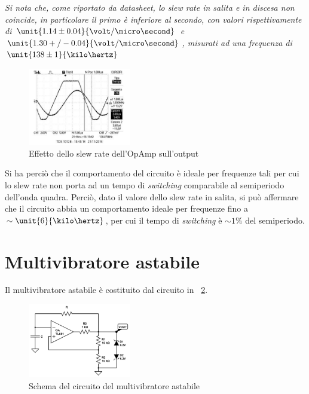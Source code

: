 \documentclass[10pt,a4paper]{article}
\begin{document}
\emph{Si nota che, come riportato da datasheet, lo slew rate in salita e in discesa non coincide, in particolare il primo è inferiore al secondo, con valori rispettivamente di $\unit{1.14 \pm 0.04}{\volt/\micro\second}$ e $\unit{1.30+/-0.04}{\volt/\micro\second}$, misurati ad una frequenza di $\unit{138 \pm 1}{\kilo\hertz}$}

\begin{figure}[H]
	\centering
	\includegraphics[width=0.40\textwidth]{../oscilloscopio/schmitt_slewrate.jpg}
	\caption{Effetto dello slew rate dell'OpAmp sull'output}
	\label{fig:slew_rate}
\end{figure}

Si ha perciò che il comportamento del circuito è ideale per frequenze tali per cui lo slew rate non porta ad un tempo di \emph{switching} comparabile al semiperiodo dell'onda quadra. Perciò, dato il valore dello slew rate in salita, si può affermare che il circuito abbia un comportamento ideale per frequenze fino a $\sim \unit{6}{\kilo\hertz}$, per cui il tempo di \emph{switching} è $\sim 1\%$ del semiperiodo.


\section{Multivibratore astabile}
Il multivibratore astabile è costituito dal circuito in \figurename{~\ref{fig:multivibratore}}.

\begin{figure}[H]
	\centering
	\includegraphics[width=0.40\textwidth]{../circuiti/multivibratore.jpg}
	\caption{Schema del circuito del multivibratore astabile}
	\label{fig:multivibratore}
\end{figure}
\end{document}
